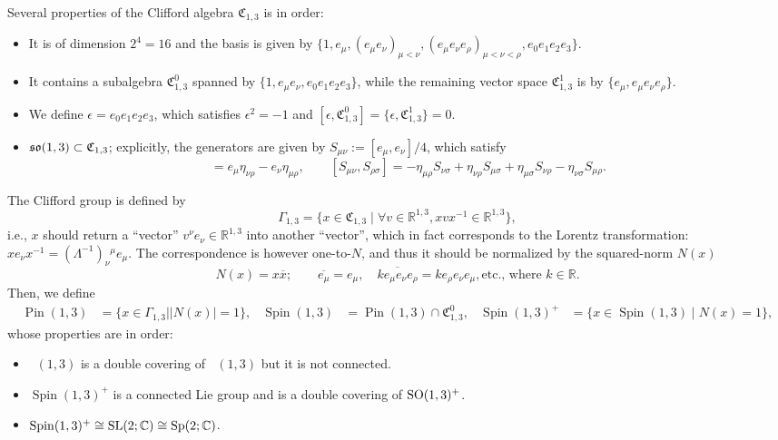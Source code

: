 \documentclass[CheatSheet]{subfiles}
\begin{document}
Several properties of the Clifford algebra $\mathfrak C_{1,3}$ is in order:
\begin{itemize}
 \item It is of dimension $2^4=16$ and the basis is given by
$\{1, e_\mu, (e_\mu e_\nu)_{\mu<\nu}, (e_\mu e_\nu e_\rho)_{\mu<\nu<\rho}, e_0e_1e_2e_3\}.$
 \item It contains a subalgebra $\mathfrak C^0_{1,3}$ spanned by $\{1, e_\mu e_\nu, e_0e_1e_2e_3\}$, while the remaining vector space $\mathfrak C^1_{1,3}$ is by $\{e_\mu, e_\mu e_\nu e_\rho\}$.
 \item We define $\epsilon=e_0e_1e_2e_3$, which satisfies $\epsilon^2=-1$ and $[\epsilon,\mathfrak C^0_{1,3}]=\{\epsilon,\mathfrak C^1_{1,3}\}=0$.
 \item $\operatorname{\mathfrak{so}}(1,3)\subset\mathfrak C_{1,3}$; explicitly, the generators are given by $S_{\mu\nu}:={[e_\mu,e_\nu]}/{4}$, which satisfy
\begin{equation}
 [S_{\mu\nu},e_\rho] = e_\mu\eta_{\nu\rho}-e_\nu\eta_{\mu\rho},\qquad
 [S_{\mu\nu},S_{\rho\sigma}] = 
-\eta_{\mu\rho}S_{\nu\sigma}
+\eta_{\nu\rho}S_{\mu\sigma}
+\eta_{\mu\sigma}S_{\nu\rho}
-\eta_{\nu\sigma}S_{\mu\rho}.
\end{equation}
\end{itemize}

The Clifford group is defined by
\begin{equation}
\Gamma_{1,3}=\{x\in\mathfrak C_{1,3}\mathbin|\forall v\in \mathbb R^{1,3}, xvx^{-1}\in \mathbb R^{1,3}\},
\end{equation}
i.e., $x$ should return a ``vector'' $v^\nu e_\nu\in \mathbb R^{1,3}$ into another ``vector'', which in fact corresponds to the Lorentz transformation:
$xe_\nu x^{-1} = (\Lambda^{-1})_\nu{}^\mu e_\mu$.
The correspondence is however one-to-$N$, and thus it should be normalized by the squared-norm $N(x)$
\begin{equation}
 N(x)=x\overline{x};\qquad\overline{e_\mu}=e_\mu,\quad\overline{ke_\mu e_\nu e_\rho}=ke_\rho e_\nu e_\mu, \text{etc., where $k\in\mathbb R$}.
\end{equation}
Then, we define
\begin{align*}
 \mathop{\mathrm{Pin}}(1,3)&=\{x\in\Gamma_{1,3}\mathbin||N(x)|=1\},&
 \mathop{\mathrm{Spin}}(1,3)&=\mathop{\mathrm{Pin}}(1,3)\cap \mathfrak C^0_{1,3},&
 \mathop{\mathrm{Spin}}(1,3)^+&=\{x\in\mathop{\mathrm{Spin}}(1,3)\mathbin|N(x)=1\},
\end{align*}
whose properties are in order:
\begin{itemize}
 \item $\mathop{\mathrm{[S]pin}}(1,3)$ is a double covering of $\mathop{\mathrm{[S]O}}(1,3)$ but it is not connected.
 \item $\mathop{\mathrm{Spin}}(1,3)^+$ is a connected Lie group and is a double covering of $\operatorname{\mathrm SO}(1,3)^+$.
 \item $\mathop{\mathrm{Spin}}(1,3)^+\cong\operatorname{\mathrm SL}(2;\mathbb C)\cong\operatorname{\mathrm Sp}(2;\mathbb C)$.
\end{itemize}
\end{document}
